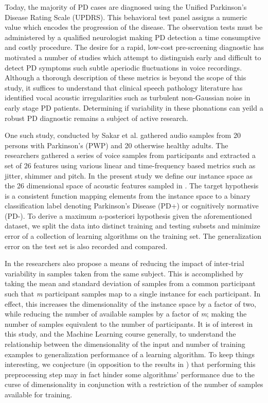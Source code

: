 \documentclass[12pt]{article}
\begin{document}
Today, the majority of PD cases are diagnosed using the Unified Parkinson's Disease Rating Scale (UPDRS). This behavioral test panel assigns a numeric value which encodes the progression of the disease. The observation tests must be administered by a qualified neurologist making PD detection a time consumptive and costly procedure. The desire for a rapid, low-cost pre-screening diagnostic has motivated a number of studies which attempt to distinguish early and difficult to detect PD symptoms such subtle aperiodic fluctuations in voice recordings. Although a thorough description of these metrics is beyond the scope of this study, it suffices to understand that clinical speech pathology literature has identified vocal acoustic irregularities such as turbulent non-Gaussian noise in early stage PD patients. Determining if variability in these phonations can yeild a robust PD diagnostic remains a subject of active research.

One such study, conducted by Sakar et al. \cite{Sakar2013} gathered audio samples from 20 persons with Parkinson's (PWP) and 20 otherwise healthy adults. The researchers gathered a series of voice samples from participants and extracted a set of 26 features using various linear and time-frequency based metrics such as jitter, shimmer and pitch. In the present study we define our instance space as the 26 dimensional space of acoustic features sampled in \cite{Sakar2013}. The target hypothesis is a consistent function mapping elements from the instance space to a binary classification label denoting Parkinson's Disease (PD+) or cognitively normative (PD-). To derive a maximum a-posteriori hypothesis given the aforementioned dataset, we split the data into distinct training and testing subsets and minimize error of a collection of learning algorithms on the training set. The generalization error on the test set is also recorded and compared.

In \cite{Sakar2013} the researchers also propose a means of reducing the impact of inter-trial variability in samples taken from the same subject. This is accomplished by taking the mean and standard deviation of samples from a common participant such that \textit{m} participant samples map to a single instance for each participant. In effect, this increases the dimensionality of the instance space by a factor of two, while reducing the number of available samples by a factor of \textit{m}; making the number of samples equivalent to the number of participants. It is of interest in this study, and the Machine Learning course generally, to understand the relationship between the dimensionality of the input and number of training examples to generalization performance of a learning algorithm. To keep things interesting, we conjecture (in opposition to the results in \cite{Sakar2013}) that performing this preprocessing step may in fact hinder some algorithms' performance due to the curse of dimensionality in conjunction with a restriction of the number of samples available for training.
\end{document}

